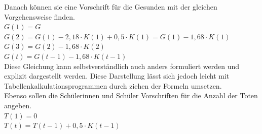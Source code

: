 Danach können sie eine Vorschrift für die Gesunden mit der gleichen Vorgehensweise finden.\\
$ G(1) = G$\\
$ G(2) = G(1) - 2,18 \cdot K(1) + 0,5 \cdot K(1) = G(1)- 1,68 \cdot K(1)$\\
$ G(3) = G(2) - 1,68 \cdot K(2)$\\
$ G(t) = G(t-1) - 1,68 \cdot K(t-1)$\\
Diese Gleichung kann selbstverständlich auch anders formuliert werden und explizit dargestellt werden. Diese Darstellung lässt sich jedoch leicht mit Tabellenkalkulationsprogrammen durch ziehen der Formeln umsetzen.\\

Ebenso sollen die Schülerinnen und Schüler Vorschriften für die Anzahl der Toten angeben.\\
$ T(1) = 0 $\\
$ T(t) = T(t-1) + 0,5 \cdot K(t-1)$\\


